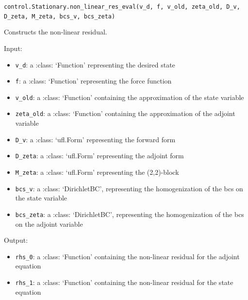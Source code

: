 \documentclass[letterpaper,10pt,english]{sphinxmanual}
\begin{document}
\vspace{3ex}

\texttt{control.Stationary.non{\_}linear{\_}res{\_}eval(v{\_}d, f, v{\_}old, zeta{\_}old, D{\_}v, D{\_}zeta, M{\_}zeta, bcs{\_}v, bcs{\_}zeta)}

Constructs the non-linear residual.

Input:
\begin{itemize}
\item \texttt{v{\_}d}: a :class: `Function' representing the desired state

\item \texttt{f}: a :class: `Function' representing the force function

\item \texttt{v{\_}old}: a :class: `Function' containing the approximation of the
            state variable

\item \texttt{zeta{\_}old}: a :class: `Function' containing the approximation of
            the adjoint variable

\item \texttt{D{\_}v}: a :class: `ufl.Form' representing the forward form

\item \texttt{D{\_}zeta}: a :class: `ufl.Form' representing the adjoint form

\item \texttt{M{\_}zeta}: a :class: `ufl.Form' representing the (2,2)-block

\item \texttt{bcs{\_}v}: a :class: `DirichletBC', representing the homogenization
            of the bcs on the state variable

\item \texttt{bcs{\_}zeta}: a :class: `DirichletBC', representing the homogenization
            of the bcs on the adjoint variable
\end{itemize}

Output:
\begin{itemize}
\item \texttt{rhs{\_}0}: a :class: `Function' containing the non-linear residual
                for the adjoint equation

\item \texttt{rhs{\_}1}: a :class: `Function' containing the non-linear residual
                for the state equation
\end{itemize}

\vspace{3ex}
\end{document}
